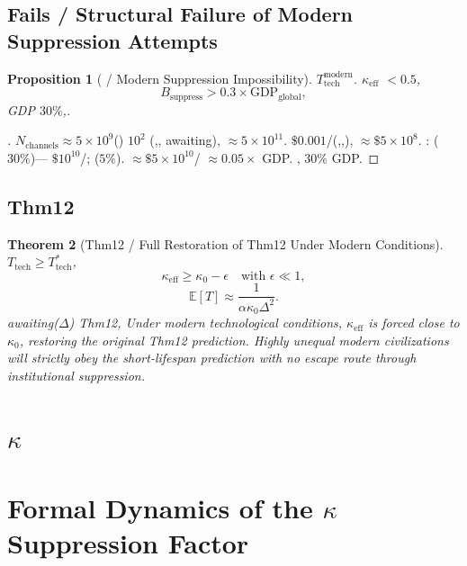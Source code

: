\documentclass[11pt,a4paper]{article}
\newtheorem{theorem}{Theorem}[section]
\newtheorem{proposition}[theorem]{Proposition}
\theoremstyle{definition}
\newcommand{\coupling}{\kappa}
\newcommand{\E}{\mathbb{E}}
\begin{document}
\subsection{Fails / Structural Failure of Modern Suppression Attempts}
\begin{proposition}[ / Modern Suppression Impossibility]
\label{prop:modern}
 $T_{\text{tech}}^{\text{modern}}$.
 $\coupling_{\text{eff}}$ $< 0.5$, 
\[
B_{\text{suppress}} > 0.3 \times \text{GDP}_{\text{global}},
\]
 GDP $30\%$,.
\end{proposition}
\begin{proof}[]
 $N_{\text{channels}} \approx 5 \times 10^9$()
 $10^2$ (,, awaiting), 
 $\approx 5 \times 10^{11}$.
 $\$0.001$/(,,), 
 $\approx \$5 \times 10^8$.
: ($30\%$)--- $\$10^{10}$/; 
($5\%$).
 $\approx \$5 \times 10^{10}$/ $\approx 0.05 \times$ GDP.
, $30\%$ GDP.
\end{proof}
\subsection{Thm12}
\begin{theorem}[Thm12 / Full Restoration of Thm12 Under Modern Conditions]
\label{thm:restored}
 $T_{\text{tech}} \geq T_{\text{tech}}^*$, 
\[
\coupling_{\text{eff}} \geq \coupling_0 - \epsilon \quad \text{with } \epsilon \ll 1,
\]
\[
\E[T] \approx \frac{1}{\alpha \coupling_0 \Delta^2}.
\]
awaiting($\Delta$) Thm12, 
Under modern technological conditions, $\coupling_{\text{eff}}$ is forced close to
$\coupling_0$, restoring the original Thm12 prediction. Highly unequal modern
civilizations will strictly obey the short-lifespan prediction with no escape
route through institutional suppression.
\end{theorem}
\section{$\coupling$}
\section{Formal Dynamics of the $\coupling$ Suppression Factor}
\end{document}
